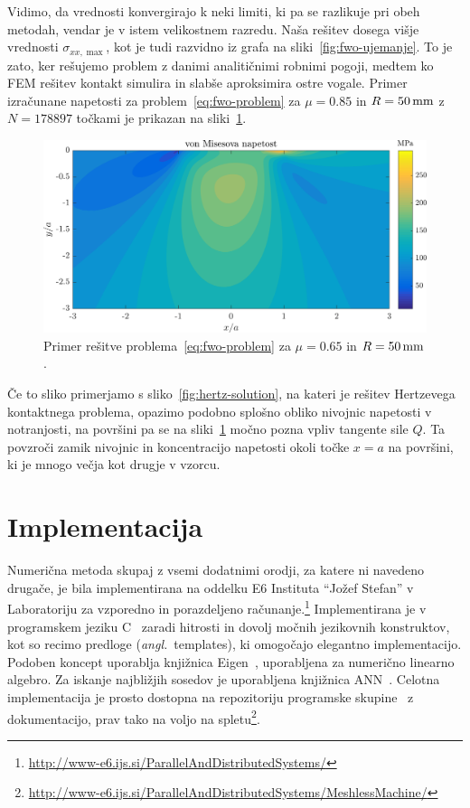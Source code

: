 \documentclass[12pt,a4paper,twoside]{article}
\theoremstyle{definition} %
\theoremstyle{plain} %
\numberwithin{equation}{section}
\newcommand{\ts}{\sigma}
\newcommand{\ang}[1]{(\hspace{-1.5px}\textit{angl.}\ #1)}
\newlength{\iw}
\let\oldsection\section
\def\section{\cleardoublepage\oldsection}
\newcommand{\CC}{C\nolinebreak\hspace{-.05em}\raisebox{.4ex}{\tiny\bf +}\nolinebreak\hspace{-.10em}\raisebox{.4ex}{\tiny\bf +}}
\begin{document}
Vidimo, da vrednosti konvergirajo k neki limiti, ki pa se razlikuje pri obeh metodah, vendar je v
istem velikostnem razredu. Naša rešitev dosega višje vrednosti $\ts_{xx, \max}$, kot je tudi
razvidno iz grafa na sliki~\ref{fig:fwo-ujemanje}. To je zato, ker rešujemo problem z danimi
analitičnimi robnimi pogoji, medtem ko FEM rešitev kontakt simulira in slabše aproksimira ostre
vogale. Primer izračunane napetosti za problem~\eqref{eq:fwo-problem} za $\mu=0.85$ in $R =
\unit[50]{mm}$ z $N = 178897$ točkami je prikazan na sliki~\ref{fig:fwo-solution}.

\begin{figure}[h]
  \centering
  \includegraphics[width=\iw]{images/fwo_solution.png}
  \caption{Primer rešitve problema~\eqref{eq:fwo-problem} za $\mu=0.65$ in $R = \unit[50]{mm}$.}
  \label{fig:fwo-solution}
\end{figure}

Če to sliko primerjamo s sliko~\ref{fig:hertz-solution}, na kateri je rešitev Hertzevega kontaktnega
problema, opazimo podobno splošno obliko nivojnic napetosti v notranjosti, na površini pa se na
sliki~\ref{fig:fwo-solution} močno pozna vpliv tangente sile $Q$. Ta povzroči zamik nivojnic in
koncentracijo napetosti okoli točke $x = a$ na površini, ki je mnogo večja kot drugje v vzorcu.

\section{Implementacija}
\label{sec:implementacija}
Numerična metoda skupaj z vsemi dodatnimi orodji, za katere ni navedeno drugače, je bila
implementirana na oddelku E6 Instituta ``Jožef Stefan'' v Laboratoriju za vzporedno in porazdeljeno
računanje.\footnote{\url{http://www-e6.ijs.si/ParallelAndDistributedSystems/}} Implementirana je
v programskem jeziku \CC~\cite{stroustrup1995c++} zaradi hitrosti in dovolj močnih jezikovnih
konstruktov, kot so recimo predloge \ang{templates}, ki omogočajo elegantno implementacijo. Podoben
koncept uporablja knjižnica Eigen~\cite{eigenweb}, uporabljena za numerično linearno algebro. Za
iskanje najbližjih sosedov je uporabljena knjižnica ANN~\cite{mount1998ann}. Celotna
implementacija je prosto dostopna na repozitoriju programske skupine~\cite{utils_web} z
dokumentacijo, prav tako na voljo na
spletu\footnote{\url{http://www-e6.ijs.si/ParallelAndDistributedSystems/MeshlessMachine/}}.
\end{document}

